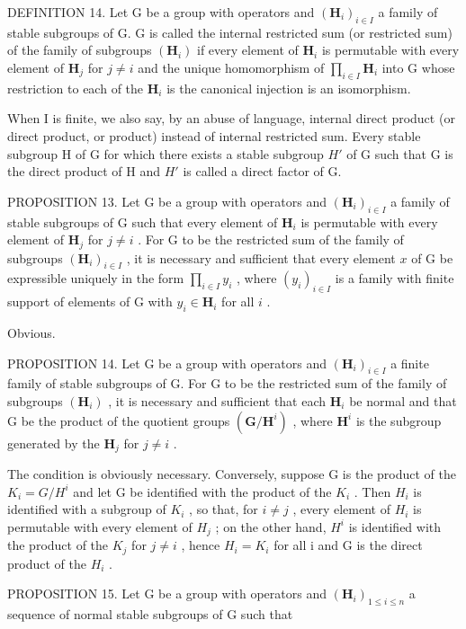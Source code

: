 DEFINITION 14. Let G be a group with operators and \((\mathbf{H}_i)_{i\in I}\) a family of stable subgroups of G. G is called the internal restricted sum (or restricted sum) of the family of subgroups \((\mathbf{H}_i)\) if every element of \(\mathbf{H}_i\) is permutable with every element of \(\mathbf{H}_j\) for \(j\neq i\) and the unique homomorphism of \(\prod_{i\in I}\mathbf{H}_i\) into G whose restriction to each of the \(\mathbf{H}_i\) is the canonical injection is an isomorphism.

When I is finite, we also say, by an abuse of language, internal direct product (or direct product, or product) instead of internal restricted sum. Every stable subgroup H of G for which there exists a stable subgroup \(H'\) of G such that G is the direct product of H and \(H'\) is called a direct factor of G.

PROPOSITION 13. Let G be a group with operators and \((\mathbf{H}_i)_{i\in I}\) a family of stable subgroups of G such that every element of \(\mathbf{H}_i\) is permutable with every element of \(\mathbf{H}_j\) for \(j\neq i\) . For G to be the restricted sum of the family of subgroups \((\mathbf{H}_i)_{i\in I}\) , it is necessary and sufficient that every element \(x\) of G be expressible uniquely in the form \(\prod_{i\in I}y_i\) , where \((y_i)_{i\in I}\) is a family with finite support of elements of G with \(y_i\in \mathbf{H}_i\) for all \(i\) .

Obvious.

PROPOSITION 14. Let G be a group with operators and \((\mathbf{H}_i)_{i\in I}\) a finite family of stable subgroups of G. For G to be the restricted sum of the family of subgroups \((\mathbf{H}_i)\) , it is necessary and sufficient that each \(\mathbf{H}_i\) be normal and that G be the product of the quotient groups \((\mathbf{G} / \mathbf{H}^i)\) , where \(\mathbf{H}^i\) is the subgroup generated by the \(\mathbf{H}_j\) for \(j\neq i\) .

The condition is obviously necessary. Conversely, suppose G is the product of the \(K_{i} = G/H^{i}\) and let G be identified with the product of the \(K_{i}\) . Then \(H_{i}\) is identified with a subgroup of \(K_{i}\) , so that, for \(i \neq j\) , every element of \(H_{i}\) is permutable with every element of \(H_{j}\) ; on the other hand, \(H^{i}\) is identified with the product of the \(K_{j}\) for \(j \neq i\) , hence \(H_{i} = K_{i}\) for all i and G is the direct product of the \(H_{i}\) .

PROPOSITION 15. Let G be a group with operators and \((\mathbf{H}_i)_{1\leqslant i\leqslant n}\) a sequence of normal stable subgroups of G such that

